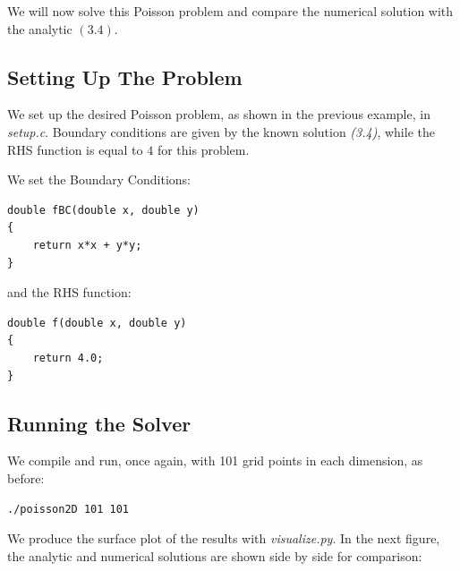 \documentclass[11pt]{report}
\begin{document}
We will now solve this Poisson problem and compare the numerical solution with the analytic $(3.4)$.

\subsection*{Setting Up The Problem}
We set up the desired Poisson problem, as shown in the previous example, in \emph{setup.c}. Boundary conditions are given by the known solution \emph{(3.4)}, while the RHS function is equal to $4$ for this problem. 
\newline

We set the Boundary Conditions:

\begin{lstlisting}
double fBC(double x, double y) 
{
    return x*x + y*y;
}
\end{lstlisting}

and the RHS function:

\begin{lstlisting}
double f(double x, double y) 
{
    return 4.0;
}
\end{lstlisting}

\subsection*{Running the Solver}
We compile and run, once again, with 101 grid points in each dimension, as before:
\newline 

\begin{lstlisting}
./poisson2D 101 101
\end{lstlisting}

We produce the surface plot of the results with \emph{visualize.py}. In the next figure, the analytic and numerical solutions are shown side by side for comparison:
\end{document}
